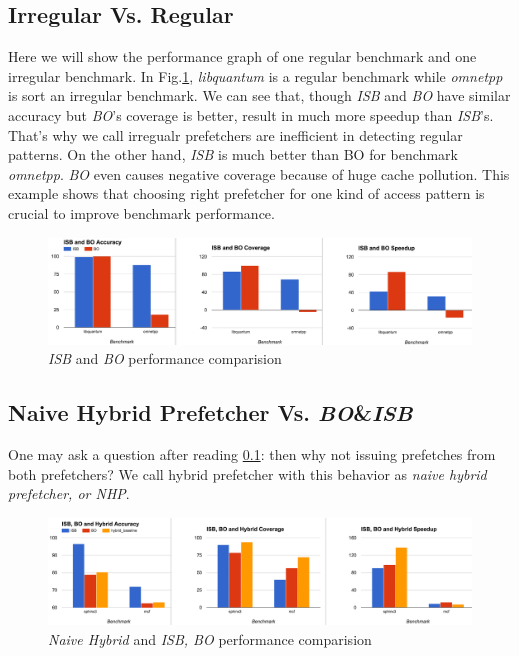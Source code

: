   \subsection{Irregular Vs. Regular}
  \label{sec:irrVsre}
  Here we will show the performance graph of one regular benchmark and one irregular benchmark. In Fig.\ref{fig:regVsirreg}, \emph{libquantum} is a regular benchmark while \emph{omnetpp} is sort an irregular benchmark. We can see that, though \emph{ISB} and \emph{BO} have similar accuracy but \emph{BO}'s coverage is better, result in much more speedup than \emph{ISB}'s. That's why we call irregualr prefetchers are inefficient in detecting regular patterns. On the other hand, \emph{ISB} is much better than BO for benchmark \emph{omnetpp}. \emph{BO} even causes negative coverage because of huge cache pollution. This example shows that choosing right prefetcher for one kind of access pattern is crucial to improve benchmark performance.
  \begin{figure}[ht!]
	  \centering
	  \includegraphics[width=1.0\textwidth]{images/isbvsbo.png}
	  \caption{\emph{ISB} and \emph{BO} performance comparision}
	  \label{fig:regVsirreg}
  \end{figure}


  \subsection{Naive Hybrid Prefetcher Vs. \emph{BO}\&\emph{ISB}}
  \label{sec:naivehy}
  One may ask a question after reading \ref{sec:irrVsre}: then why not issuing prefetches from both prefetchers? We call hybrid prefetcher with this behavior as \emph{naive hybrid prefetcher, or NHP}.
  \begin{figure}[ht!]
	  \centering
	  \includegraphics[width=1.0\textwidth]{images/hybridVssingle.png}
	  \caption{\emph{Naive Hybrid} and \emph{ISB, BO} performance comparision}
	  \label{fig:hybridVssingle}
  \end{figure}

